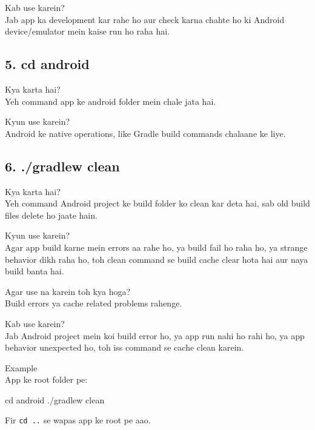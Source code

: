 \documentclass[a4paper]{article}
\newcommand\imp[1]{{\color{ImportantRed}#1}}
\begin{document}
\imp{Kab use karein?}\\
Jab app ka development kar rahe ho aur check karna chahte ho ki Android device/emulator mein kaise run ho raha hai.

\vspace{0.9em}
\subsection*{5. cd android}
\imp{Kya karta hai?}\\
Yeh command app ke \imp{android} folder mein chale jata hai.

\imp{Kyun use karein?}\\
Android ke native operations, like Gradle build commands chalaane ke liye.

\vspace{0.9em}
\subsection*{6. ./gradlew clean}
\imp{Kya karta hai?}\\
Yeh command Android project ke build folder ko clean kar deta hai, sab old build files delete ho jaate hain.

\imp{Kyun use karein?}\\
Agar app build karne mein errors aa rahe ho, ya build fail ho raha ho, ya strange behavior dikh raha ho, toh clean command se build cache clear hota hai aur naya build banta hai.

\imp{Agar use na karein toh kya hoga?}\\
Build errors ya cache related problems rahenge.

\imp{Kab use karein?}\\
Jab Android project mein koi build error ho, ya app run nahi ho rahi ho, ya app behavior unexpected ho, toh iss command se cache clean karein.

\imp{Example}\\
App ke root folder pe:

\begin{codeblock}
cd android
./gradlew clean
\end{codeblock}

Fir \texttt{cd ..} se wapas app ke root pe aao.

\vspace{0.9em}
\end{document}
